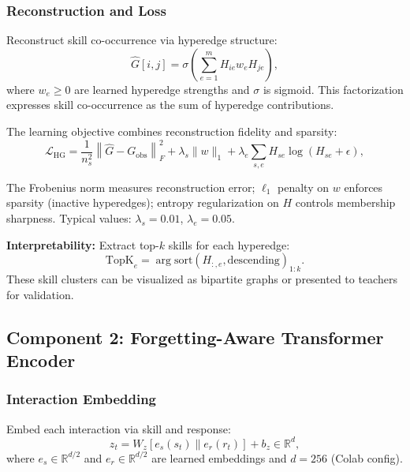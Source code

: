 \documentclass[preprint,12pt]{elsarticle}
\begin{document}
\subsubsection{Reconstruction and Loss}

Reconstruct skill co-occurrence via hyperedge structure:
\begin{equation}
\widehat{G}[i,j] = \sigma\left(\sum_{e=1}^{m} H_{ie} w_e H_{je}\right),
\label{eq:reconstruction}
\end{equation}
where $w_e \geq 0$ are learned hyperedge strengths and $\sigma$ is sigmoid. This factorization expresses skill co-occurrence as the sum of hyperedge contributions.

The learning objective combines reconstruction fidelity and sparsity:
\begin{equation}
\mathcal{L}_{\text{HG}} = \frac{1}{n_s^2}\left\|\widehat{G} - G_{\text{obs}}\right\|_F^2 + \lambda_s \|w\|_1 + \lambda_e \sum_{s,e} H_{se} \log(H_{se} + \epsilon),
\label{eq:hypergraph-loss}
\end{equation}

The Frobenius norm measures reconstruction error; $\ell_1$ penalty on $w$ enforces sparsity (inactive hyperedges); entropy regularization on $H$ controls membership sharpness. Typical values: $\lambda_s = 0.01$, $\lambda_e = 0.05$.

\textbf{Interpretability:} Extract top-$k$ skills for each hyperedge:
\begin{equation}
\text{TopK}_e = \arg\text{sort}(H_{:,e}, \text{descending})_{1:k}.
\end{equation}
These skill clusters can be visualized as bipartite graphs or presented to teachers for validation.

\subsection{Component 2: Forgetting-Aware Transformer Encoder}\label{subsec:transformer}

\subsubsection{Interaction Embedding}

Embed each interaction via skill and response:
\begin{equation}
z_t = W_z [e_s(s_t) \| e_r(r_t)] + b_z \in \mathbb{R}^d,
\label{eq:embedding}
\end{equation}
where $e_s \in \mathbb{R}^{d/2}$ and $e_r \in \mathbb{R}^{d/2}$ are learned embeddings and $d=256$ (Colab config).
\end{document}
